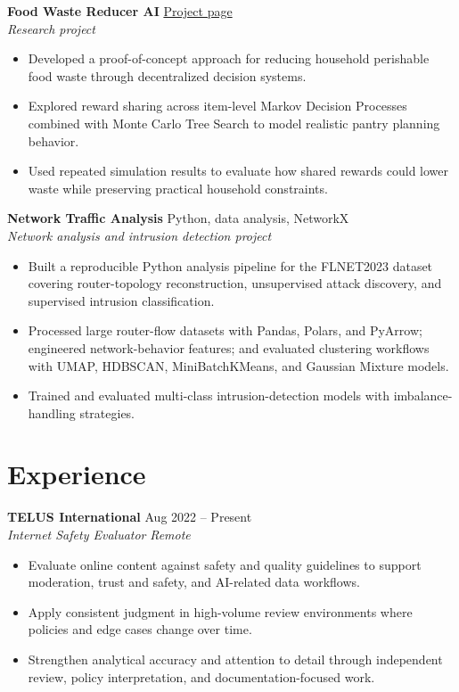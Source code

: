 \documentclass[11pt]{article}
\newcommand{\resumeentry}[4]{
  \textbf{#1} \hfill #2 \\
  \textit{#3}%
  \if\relax\detokenize{#4}\relax
  \else
    \hfill \textit{#4}%
  \fi
}
\begin{document}
\resumeentry{Food Waste Reducer AI}{\href{https://johnmgilbert.github.io/pages/project/seniorProj.html}{Project page}}{Research project}{}
\begin{itemize}
  \item Developed a proof-of-concept approach for reducing household perishable food waste through decentralized decision systems.
  \item Explored reward sharing across item-level Markov Decision Processes combined with Monte Carlo Tree Search to model realistic pantry planning behavior.
  \item Used repeated simulation results to evaluate how shared rewards could lower waste while preserving practical household constraints.
\end{itemize}

\resumeentry{Network Traffic Analysis}{Python, data analysis, NetworkX}{Network analysis and intrusion detection project}{}
\begin{itemize}
  \item Built a reproducible Python analysis pipeline for the FLNET2023 dataset covering router-topology reconstruction, unsupervised attack discovery, and supervised intrusion classification.
  \item Processed large router-flow datasets with Pandas, Polars, and PyArrow; engineered network-behavior features; and evaluated clustering workflows with UMAP, HDBSCAN, MiniBatchKMeans, and Gaussian Mixture models.
  \item Trained and evaluated multi-class intrusion-detection models with imbalance-handling strategies.
\end{itemize}

\section*{Experience}
\resumeentry{TELUS International}{Aug 2022 -- Present}{Internet Safety Evaluator}{Remote}
\begin{itemize}
  \item Evaluate online content against safety and quality guidelines to support moderation, trust and safety, and AI-related data workflows.
  \item Apply consistent judgment in high-volume review environments where policies and edge cases change over time.
  \item Strengthen analytical accuracy and attention to detail through independent review, policy interpretation, and documentation-focused work.
\end{itemize}
\end{document}
